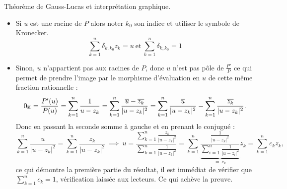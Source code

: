\documentclass{article}
\renewenvironment{question_kholle}[2][ ]
{
	\subsection{\texorpdfstring{#2}{}}
	\notblank{#1}
	{
		\noindent #1
		\bigbreak
	}
	{}
	\begin{proof}
}
{
	\end{proof}
}
\begin{document}
\begin{question_kholle}
  [Les racines du polynôme dérivée sont dans l'enveloppe convexe des racines du polynôme. \\
    Soit {$P\in \C[X]$} de degré au moins $2$ et notons $z_1, \dots, z_n$ ses racines répétées avec multiplicité. \\
    Soit $u$ une racine de $P'$.
    Alors :
    \begin{equation}
      \exists \ (c_1, \dots, c_n)\in \R ^*_+ \ : \ \sum_{k=1}^n c_k z_k = u \ \text{et} \ \sum_{k=1}^n c_k = 1.
    \end{equation}]
  {Théorème de Gauss-Lucas et interprétation graphique.}
  \begin{itemize}[label=$\star$]
    \item Si $u$ est une racine de $P$ alors noter $k_0$ son indice et utiliser le symbole de Kronecker. 
  $$ \sum_{k=1}^n \delta_{k, k_0} z_k = u \ \text{et} \ \sum_{k=1}^n \delta_{k, k_0} = 1 $$
  \item Sinon, $u$ n'appartient pas aux racines de $P$, donc $u$ n'est pas pôle de $\frac{P'}{P}$ ce qui permet de prendre l'image par le morphisme d'évaluation en $u$ de cette même fraction rationnelle :
  \[
    0_{\mathbb K} = \frac{P'(u)}{P(u)} = \sum_{k = 1}^n \frac{1}{u - z_k} = \sum_{k = 1}^n \frac{\overline{u}- \overline{z_k}}{|u-z_k|^2} = \sum_{k = 1}^n \frac{\overline{u}}{|u-z_k|^2}- \sum_{k = 1}^n \frac{\overline{z_k}}{|u-z_k|^2}.
  \]
  Donc en passant la seconde somme à gauche et en prenant le conjugué :
  \[
    \sum_{k = 1}^n\frac{u}{|u-z_k|^2} = \sum_{k = 1}^n \frac{z_k}{|u-z_k|^2} \ \implies \ u = \frac{\sum_{k = 1}^n \frac{z_k}{|u-z_k|^2}}{\sum_{k = 1}^n\frac{1}{|u-z_k|^2}}= \sum_{k = 1}^n\underset{= \ c_k}{\underbrace{\frac{\frac{1}{|u-z_k|^2}}{\sum_{i = 1}^n\frac{1}{|u-z_i|^2}}}} z_k = \sum_{k=1}^n c_k z_k ,
  \]
  ce qui démontre la première partie du résultat, il est immédiat de vérifier que $\sum_{k=1}^nc_k = 1$, vérification laissée aux lecteurs. Ce qui achève la preuve. 
\end{itemize}
  \begin{figure}[H]
    \centering
\end{figure}
\end{question_kholle}
\end{document}

